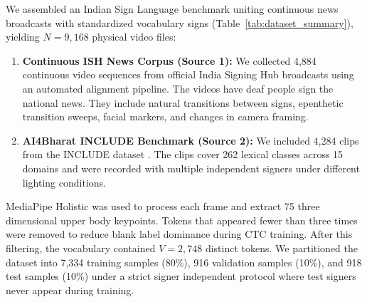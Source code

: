 \documentclass[conference]{IEEEtran}
\begin{document}
\begin{table}[H]
\centering
\caption{Dataset Composition and Partitioning}
\label{tab:dataset_summary}
\end{table}

We assembled an Indian Sign Language benchmark uniting continuous news broadcasts with standardized vocabulary signs (Table~\ref{tab:dataset_summary}), yielding $N = 9{,}168$ physical video files:
\begin{enumerate}
    \item \textbf{Continuous ISH News Corpus (Source 1):}
    We collected 4,884 continuous video sequences from official India Signing Hub broadcasts using an automated alignment pipeline. The videos have deaf people sign the national news. They include natural transitions between signs, epenthetic transition sweeps, facial markers, and changes in camera framing.

    \item \textbf{AI4Bharat INCLUDE Benchmark (Source 2):}
    We included 4,284 clips from the INCLUDE dataset \cite{b10}. The clips cover 262 lexical classes across 15 domains and were recorded with multiple independent signers under different lighting conditions.
\end{enumerate}

MediaPipe Holistic was used to process each frame and extract 75 three dimensional upper body keypoints. Tokens that appeared fewer than three times were removed to reduce blank label dominance during CTC training. After this filtering, the vocabulary contained $V = 2{,}748$ distinct tokens. We partitioned the dataset into 7,334 training samples (80\%), 916 validation samples (10\%), and 918 test samples (10\%) under a strict signer independent protocol where test signers never appear during training.
\end{document}
